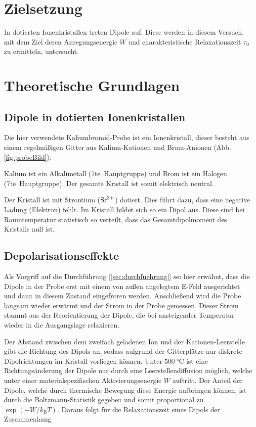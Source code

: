 \section{Zielsetzung}
\label{sec:zielsetzung}
In dotierten Ionenkristallen treten Dipole auf.
Diese werden in diesem Versuch, mit dem Ziel deren Anregungsenergie $W$ und
charakteristische Relaxationszeit $τ_0$ zu ermitteln, untersucht.

\section{Theoretische Grundlagen}
\label{sec:theorie}
\subsection{Dipole in dotierten Ionenkristallen}
Die hier verwendete Kaliumbromid-Probe ist ein Ionenkristall,
dieser besteht aus einem regelmäßigen Gitter aus
Kalium-Kationen und Brom-Anionen (Abb. \ref{fig:probeBild}).
\FloatBarrier

\FloatBarrier
Kalium ist ein Alkalimetall (1te~Hauptgruppe) und Brom ist ein Halogen
(7te~Hauptgruppe). Der gesamte Kristall ist somit elektrisch neutral.

Der Kristall ist mit Strontium ($\ce{Sr^{2+}}$) dotiert.
Dies führt dazu, dass eine negative Ladung (Elektron) fehlt.
Im Kristall bildet sich so ein Dipol aus.
Diese sind bei Raumtemperatur statistisch so verteilt, dass das
Gesamtdipolmoment des Kristalls null ist.

\subsection{Depolarisationseffekte}
Als Vorgriff auf die Durchführung [\ref{sec:durchfuehrung}] sei hier erwähnt,
dass die Dipole in der Probe erst mit einem von außen angelegtem E-Feld
ausgerichtet und dann in diesem Zustand eingefroren werden.
Anschließend wird die Probe langsam wieder erwärmt
und der Strom in der Probe gemessen.
Dieser Strom stammt aus der Reorientierung der Dipole, die bei ansteigender
Temperatur wieder in die Ausgangslage relaxieren.

Der Abstand zwischen dem zweifach geladenen Ion und der Kationen-Leerstelle gibt die Richtung des Dipols an, sodass aufgrund
der Gitterplätze nur diskrete Dipolrichtungen im Kristall vorliegen können.
Unter $\SI{500}{\celsius}$ ist eine Richtungsänderung der Dipole nur durch eine Leerstellendiffusion möglich, welche unter einer
materialspezifischen Aktivierungsenergie $W$ auftritt.
Der Anteil der Dipole, welche durch thermische Bewegung diese Energie aufbringen können, ist durch die Boltzmann-Statistik gegeben
und somit proportional zu $\exp{\left(-W/k_\text{B}T\right)}$.
Daraus folgt für die Relaxationszeit eines Dipols der Zusammenhang

